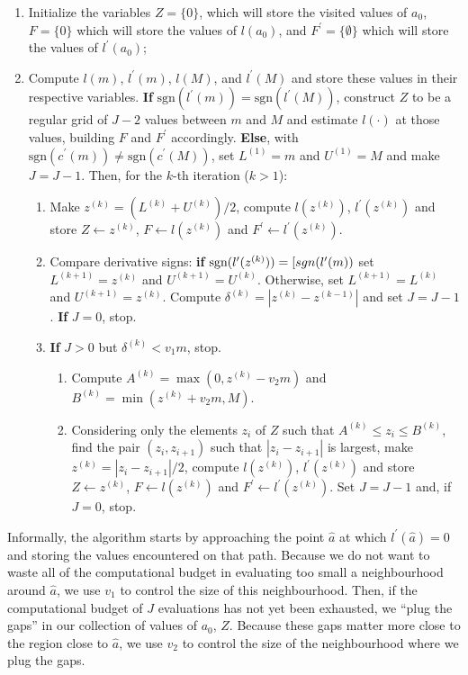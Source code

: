 \documentclass[a4paper, notitlepage, 11pt]{article}
\begin{document}
\begin{enumerate}
 \item Initialize the variables $Z = \{ 0\}$, which will store the visited values of $a_0$,  $F = \{ 0\}$ which will store the values of $l(a_0)$, and $F^{\prime} = \{ \emptyset \}$ which will store the values of $l^{\prime}(a_0)$;
 \item Compute $l(m)$, $l^\prime(m)$, $l(M)$, and $l^\prime(M)$ and store these values in their respective variables.
\textbf{If} $\text{sgn}(l^\prime(m)) = \text{sgn}(l^\prime(M))$, construct $Z$ to be a regular grid of $J - 2$ values between $m$ and $M$ and estimate $l(\cdot)$ at those values, building $F$ and $F^{\prime}$ accordingly. 
\textbf{Else}, with $\text{sgn}(c^\prime(m)) \neq \text{sgn}(c^\prime(M))$, set $L^{(1)} = m$ and $U^{(1)} = M$ and  make $J = J - 1$.
Then, for the $k$-th iteration ($k > 1$):
 \begin{enumerate}
 \item Make $z^{(k)} = (L^{(k)} + U^{(k)})/2$, compute $l(z^{(k)})$, $l^{\prime}(z^{(k)})$ and store $Z \leftarrow z^{(k)}$, $F \leftarrow l(z^{(k)})$ and $F^{\prime} \leftarrow l^{\prime}(z^{(k)})$.
 \item Compare derivative signs: \textbf{if} $ \text{sgn}(l^\prime(z^{(k)})) = \text[{sgn}(l^\prime(m))$ set $L^{(k + 1)} = z^{(k)}$ and $U^{(k + 1)} = U^{(k)}$. 
 Otherwise, set $L^{(k + 1)} = L^{(k)}$ and $U^{(k + 1)} = z^{(k)}$. 
 Compute $\delta^{(k)} = |z^{(k)} - z^{(k-1)}|$ and set $J = J - 1$.
 \textbf{If} $J = 0$, stop.
 \item \textbf{If} $J > 0$ but $\delta^{(k)}  <  v_1 m $, stop.
 \begin{enumerate}
  \item Compute $A^{(k)} = \max(0, z^{(k)} - v_2m)$ and $ B^{(k)} = \min(z^{(k)} + v_2m, M)$.
  \item Considering only the elements $z_i$ of $Z$ such that $A^{(k)} \leq z_i \leq B^{(k)}$, find the pair $(z_i, z_{i + 1})$ such that $|z_{i} -z_{i + 1}|$ is largest, make $z^{(k)}  = |z_{i} -z_{i + 1}|/2$, compute $l(z^{(k)})$, $l^{\prime}(z^{(k)})$ and store $Z \leftarrow z^{(k)}$, $F \leftarrow l(z^{(k)})$ and $F^{\prime} \leftarrow l^{\prime}(z^{(k)})$.
  Set $J = J -1$ and, if $J = 0$, stop.
 \end{enumerate}
\end{enumerate}
\end{enumerate}
 
 Informally, the algorithm starts by approaching the point $\hat{a}$ at which $l^\prime(\hat{a}) = 0$ and storing the values encountered on that path.
 Because we do not want to waste all of the computational budget in evaluating too small a neighbourhood around $\hat{a}$, we use $v_1$ to control the size of this neighbourhood.
 Then, if the computational budget of $J$ evaluations has not yet been exhausted, we ``plug the gaps'' in our collection of values of $a_0$, $Z$.
 Because these gaps matter more close to the region close to $\hat{a}$, we use $v_2$ to control the size of the neighbourhood where we plug the gaps.
 
\end{document}
